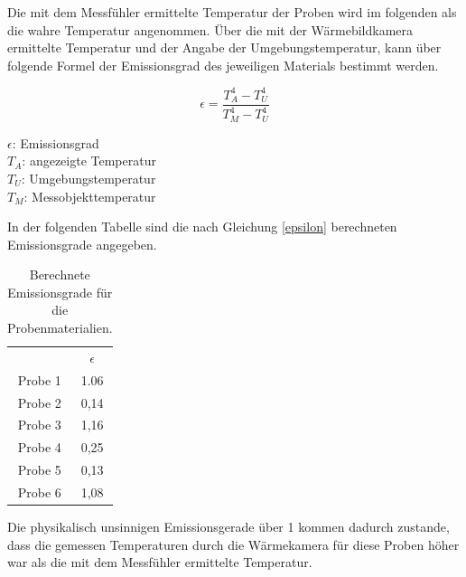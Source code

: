 Die mit dem Messfühler ermittelte Temperatur der Proben wird im folgenden als die wahre Temperatur angenommen. Über die mit der Wärmebildkamera ermittelte Temperatur und der Angabe der Umgebungstemperatur, kann über folgende Formel der Emissionsgrad des jeweiligen Materials bestimmt werden. 

\begin{equation}\label{\epsilon}
\epsilon=\frac{T_A^4-T_U^4}{T_M^4-T_U^4}
\end{equation}

\begin{center}
	\begin{small}
		$\epsilon$: Emissionsgrad\\
		$T_A$: angezeigte Temperatur\\
		$T_U$: Umgebungstemperatur\\
		$T_M$: Messobjekttemperatur\\
	\end{small}
\end{center}

In der folgenden Tabelle sind die nach Gleichung \ref{epsilon} berechneten Emissionsgrade angegeben. 

\begin{table}[H]
	\centering
	\caption{Berechnete Emissionsgrade für die Probenmaterialien.}
	\label{tab:emisionsgrade}
	\begin{tabular}{cc}
		& $\epsilon$   \\
		Probe 1 &     1.06                    \\
		Probe 2 & 0,14                         \\
		Probe 3 &         1,16                \\
		Probe 4& 0,25\\
		Probe 5&0,13 \\
		Probe 6& 1,08
	\end{tabular}
\end{table}

Die physikalisch unsinnigen Emissionsgerade über 1 kommen dadurch zustande, dass die gemessen Temperaturen durch die Wärmekamera für diese Proben höher war als die mit dem Messfühler ermittelte Temperatur. 